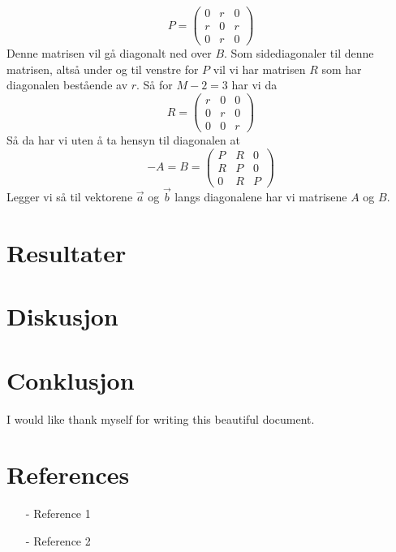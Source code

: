 \documentclass[reprint,english,notitlepage]{revtex4-2}  %
\begin{document}
$$
P=\begin{pmatrix}
	0 &r&0\\
	r &0 &r \\
	0 & r& 0
\end{pmatrix}
$$
Denne matrisen vil gå diagonalt ned over $B$. Som sidediagonaler til denne matrisen, altså under og til venstre for $P$ vil vi har matrisen $R$ som har diagonalen bestående av $r$. Så for $M-2=3$ har vi da
$$
R=\begin{pmatrix}
	r&0&0 \\
	0&r&0 \\
	0&0&r
\end{pmatrix}
$$
Så da har vi uten å ta hensyn til diagonalen at
$$
-A=B=\begin{pmatrix}
	P&R&0 \\
	R&P&0 \\
	0&R&P
\end{pmatrix}
$$
Legger vi så til vektorene $\vec{a}$ og $\vec{b}$ langs diagonalene har vi matrisene $A$ og $B$.
\section{Resultater}
\section{Diskusjon}
\section{Conklusjon}
\begin{acknowledgments}  %
I would like thank myself for writing this beautiful document.
\end{acknowledgments}


\section*{References}  %
\begin{itemize}
\item[-]Reference 1
\item[-]Reference 2
\end{itemize}
\end{document}
